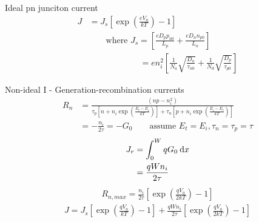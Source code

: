 \documentclass[a4paper, twocolumn]{article}
\begin{document}
    \par Ideal pn junciton current
    \begin{equation*}
        \begin{aligned}
            J &= J_s \left[ \exp\left( \frac{eV_a}{kT}  \right) - 1 \right] \\
            & \qquad  \text{where } J_s = \left[ \frac{eD_p p_{n0} }{L_p} + \frac{eD_n n_{p0} }{L_n}  \right] \\
            & \qquad \qquad \qquad   =en_{i}^{2}\left[\frac{1}{N_{a}} \sqrt{\frac{D_{n}}{\tau_{n 0}}}+\frac{1}{N_{d}} \sqrt{\frac{D_{p}}{\tau_{p 0}}}\right]
        \end{aligned}
    \end{equation*}
    
    \par Non-ideal I - Generation-recombination currents
    \begin{equation*}
        \begin{aligned}
            R_n &= \frac{(np - n_i^2)}{\tau_p \left[ n + n_i \exp \left( \frac{E_t - E_i}{kT}  \right) \right] + \tau_n \left[ p + n_i \exp \left( \frac{E_i - E_t}{kT}  \right) \right]} \\
            &= -\frac{n_i}{2\tau} = -G_0 \qquad \text{assume } E_t = E_i, \tau_n = \tau_p = \tau
        \end{aligned}
    \end{equation*}
    \begin{equation*}
        \begin{aligned}
            J_r &= \int_0^W q G_0 \: \mathrm{d} x \\
            &= \frac{qWn_i}{2\tau} 
        \end{aligned}
    \end{equation*}
    \begin{equation*}
        \begin{aligned}
            R_{n, max} = \frac{n_i}{2\tau} \left[ \exp \left( \frac{qV_a}{2kT} \right) - 1 \right]
        \end{aligned}
    \end{equation*}
    \begin{equation*}
        \begin{aligned}
            J = J_s \left[ \exp\left( \frac{qV_a}{kT}  \right)  - 1 \right] + \frac{q W n_i}{2\tau} \left[ \exp \left( \frac{qV_a}{2kT}  \right) - 1 \right]
        \end{aligned}
    \end{equation*}
\end{document}
